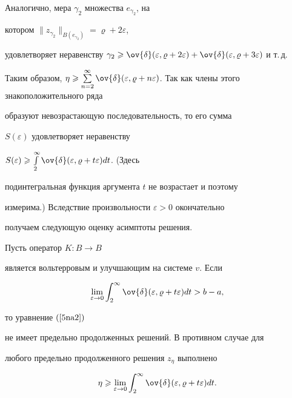 Аналогично, мера $\gamma_2$ множества $e_{\gamma_2}$, на


котором $\|z_{\gamma_2}\|_{B(e_{\gamma_2})}= \varrho+2\varepsilon$,


удовлетворяет неравенству $ \gamma_2 \geqslant


\ov{\delta}(\varepsilon, \varrho+2\varepsilon)+


\ov{\delta}(\varepsilon, \varrho+3\varepsilon)$ и т.\,д.


Таким образом, $\eta\geqslant


\sum\limits_{n=2}^\infty \ov{\delta} (\varepsilon, \varrho+n


\varepsilon)$. Так как члены этого знакоположительного ряда


образуют невозрастающую последовательность, то его сумма


$S(\varepsilon)$ удовлетворяет неравенству


$S(\varepsilon)\geqslant \int\limits_2^\infty \ov{\delta}


(\varepsilon, \varrho+t \varepsilon) d t$. (Здесь


подинтегральная функция аргумента $t$ не возрастает и поэтому


измерима.) Вследствие произвольности $\varepsilon >0$ окончательно


получаем следующую оценку асимптоты решения.








\begin{thm}


Пусть оператор $K:B \to B$


является вольтерровым и улучшающим на системе $v$. Если


\begin{equation}\label{5na18}


\lim_{\varepsilon\to 0}


\int_2^\infty \ov{\delta} (\varepsilon, \varrho+t


\varepsilon) d t >b-a,


\end{equation}


то уравнение $(\ref{5na2})$


не имеет предельно продолженных решений. В противном случае для


любого предельно продолженного решения $z_\eta$ выполнено


\begin{equation}\label{5na19}


\eta\geqslant \lim_{\varepsilon\to


0} \int_2^\infty \ov{\delta} (\varepsilon, \varrho+t


\varepsilon) d t.


\end{equation}


\end{thm}








